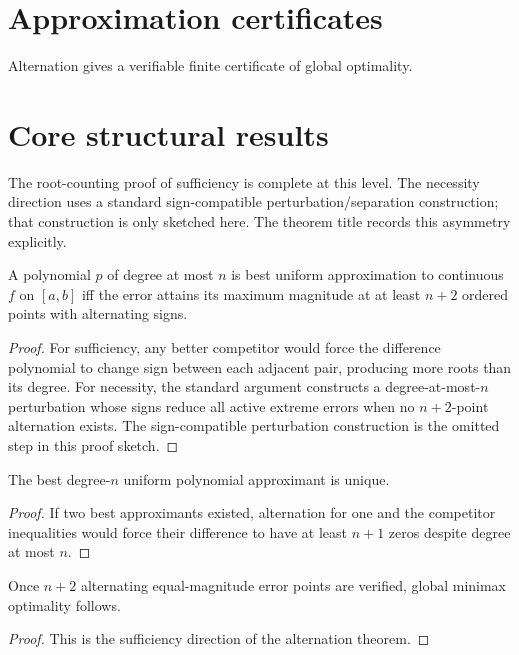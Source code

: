 \section{Approximation certificates}
Alternation gives a verifiable finite certificate of global optimality.

\section{Core structural results}

\begin{remark}
The root-counting proof of sufficiency is complete at this level. The necessity direction uses a standard sign-compatible perturbation/separation construction; that construction is only sketched here. The theorem title records this asymmetry explicitly.
\end{remark}

\begin{theorem}\label{thm:ii23-01}
A polynomial $p$ of degree at most $n$ is best uniform approximation to continuous $f$ on $[a,b]$ iff the error attains its maximum magnitude at at least $n+2$ ordered points with alternating signs.
\begin{proof}
For sufficiency, any better competitor would force the difference polynomial to change sign between each adjacent pair, producing more roots than its degree. For necessity, the standard argument constructs a degree-at-most-$n$ perturbation whose signs reduce all active extreme errors when no $n+2$-point alternation exists. The sign-compatible perturbation construction is the omitted step in this proof sketch.
\end{proof}
\end{theorem}

\begin{theorem}[Uniqueness]\label{thm:ii23-02}
The best degree-$n$ uniform polynomial approximant is unique.
\begin{proof}
If two best approximants existed, alternation for one and the competitor inequalities would force their difference to have at least $n+1$ zeros despite degree at most $n$.
\end{proof}
\end{theorem}

\begin{theorem}\label{thm:ii23-03}
Once $n+2$ alternating equal-magnitude error points are verified, global minimax optimality follows.
\begin{proof}
This is the sufficiency direction of the alternation theorem.
\end{proof}
\end{theorem}

